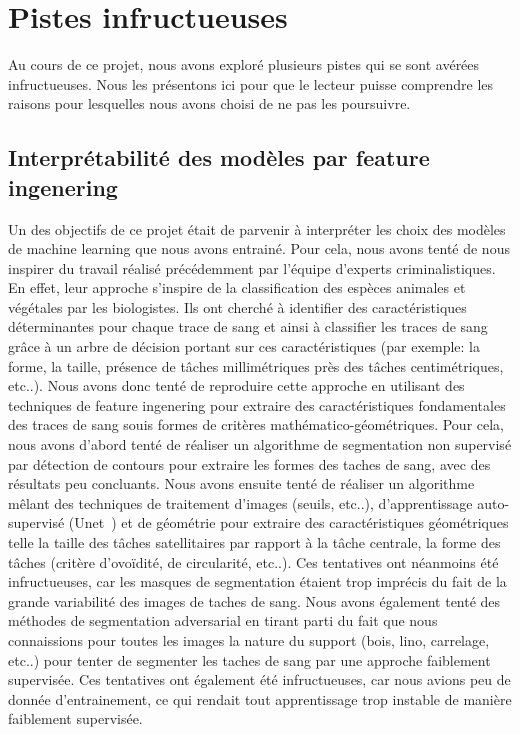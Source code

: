

\section{Pistes infructueuses}

Au cours de ce projet, nous avons exploré plusieurs pistes qui se sont avérées infructueuses. Nous les présentons ici pour que le lecteur puisse comprendre les raisons pour lesquelles nous avons choisi de ne pas les poursuivre.

\subsection{Interprétabilité des modèles par feature ingenering}

Un des objectifs de ce projet était de parvenir à interpréter les choix des modèles de machine learning que nous avons entrainé.
Pour cela, nous avons tenté de nous inspirer du travail réalisé précédemment par l'équipe d'experts criminalistiques. En effet,
leur approche s'inspire de la classification des espèces animales et végétales par les biologistes. Ils ont cherché à identifier des caractéristiques
déterminantes pour chaque trace de sang et ainsi à classifier les traces de sang grâce à un arbre de décision
portant sur ces caractéristiques (par exemple: la forme, la taille, présence de tâches millimétriques près des tâches centimétriques, etc..).
Nous avons donc tenté de reproduire cette approche en utilisant des techniques de feature ingenering pour extraire des caractéristiques
fondamentales des traces de sang souis formes de critères mathématico-géométriques. Pour cela, nous avons d'abord tenté de réaliser
un algorithme de segmentation non supervisé par détection de contours pour extraire les formes des taches de sang, avec des résultats peu concluants. Nous avons ensuite
tenté de réaliser un algorithme mêlant des techniques de traitement d'images (seuils, etc..), d'apprentissage auto-supervisé (Unet~\cite{UNet}) et de géométrie pour extraire des caractéristiques géométriques telle la taille
des tâches satellitaires par rapport à la tâche centrale, la forme des tâches (critère d'ovoïdité, de circularité, etc..). Ces tentatives ont néanmoins
été infructueuses, car les masques de segmentation étaient trop imprécis du fait de la grande variabilité des images de taches de sang. Nous avons également tenté des méthodes de segmentation
adversarial en tirant parti du fait que nous connaissions pour toutes les images la nature du support (bois, lino, carrelage, etc..) pour tenter de segmenter les taches de sang par une approche faiblement supervisée. Ces tentatives ont également été infructueuses, car nous 
avions peu de donnée d'entrainement, ce qui rendait tout apprentissage trop instable de manière faiblement supervisée.

